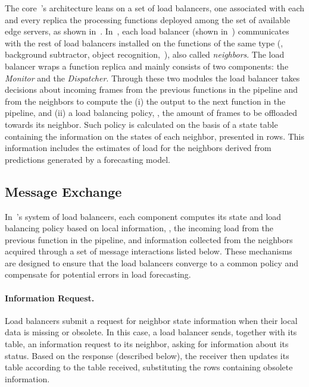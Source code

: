 The core~\videojam{}'s architecture leans on a set of load balancers, one associated with each and every replica the processing functions deployed among the set of available edge servers, as shown in~. In~\videojam{}, each load balancer (shown in~) communicates with the rest of load balancers installed on the functions of the same type (\eg, background subtractor, object recognition,~\etc), also called \textit{neighbors}. The load balancer wraps a function replica and mainly consists of two components: the \textit{Monitor} and the \textit{Dispatcher}. Through these two modules the load balancer takes decisions about incoming frames from the previous functions in the pipeline and from the neighbors to compute the (i) the output to the next function in the pipeline, and (ii) a load balancing policy, \ie, the amount of frames to be offloaded towards its neighbor. Such policy is calculated on the basis of a state table containing the information on the states of each neighbor, presented in rows. This information includes the estimates of load for the neighbors derived from predictions generated by a forecasting model. 

\subsection{Message Exchange}
In~\videojam{}'s system of load balancers, each component computes its state and load balancing policy based on local information, \ie, the incoming load from the previous function in the pipeline, and information collected from the neighbors acquired through a set of message interactions listed below. These mechanisms are designed to ensure that the load balancers converge to a common policy and compensate for potential errors in load forecasting.

\paragraph{Information Request.} Load balancers submit a request for neighbor state information when their local data is missing or obsolete. In this case, a load balancer sends, together with its table, an information request to its neighbor, asking for information about its status. Based on the response (described below), the receiver then updates its table according to the table received, substituting the rows containing obsolete information. 

